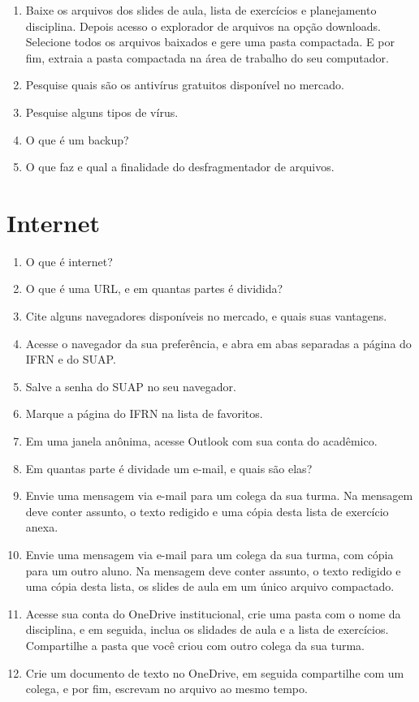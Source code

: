 \documentclass[11pt]{article}
\begin{document}
\begin{enumerate}
		\item Baixe os arquivos dos slides de aula, lista de exercícios e planejamento disciplina. Depois acesso o explorador de arquivos na opção downloads. Selecione todos os arquivos baixados e gere uma pasta compactada. E por fim, extraia a pasta compactada na área de trabalho do seu computador.
		\item Pesquise quais são os antivírus gratuitos disponível no mercado.
		\item Pesquise alguns tipos de vírus.
		\item O que é um backup?
		\item O que faz e qual a finalidade do desfragmentador de arquivos. 
	\end{enumerate}
	
	\section{Internet}
	
	\begin{enumerate}
		\item O que é internet?
		\item O que é uma URL, e em quantas partes é dividida?
		\item Cite alguns navegadores disponíveis no mercado, e quais suas vantagens.
		\item Acesse o navegador da sua preferência, e abra em abas separadas a página do IFRN e do SUAP.
		\item Salve a senha do SUAP no seu navegador.
		\item Marque a página do IFRN na lista de favoritos.
		\item Em uma janela anônima, acesse Outlook com sua conta do acadêmico.
		\item Em quantas parte é dividade um e-mail, e quais são elas?
		\item Envie uma mensagem via e-mail para um colega da sua turma. Na mensagem deve conter assunto, o texto redigido e uma cópia desta lista de exercício anexa.
		\item Envie uma mensagem via e-mail para um colega da sua turma, com cópia para um outro aluno. Na mensagem deve conter assunto, o texto redigido e uma cópia desta lista, os slides de aula em um único arquivo compactado.
		\item Acesse sua conta do OneDrive institucional, crie uma pasta com o nome da disciplina, e em seguida, inclua os slidades de aula e a lista de exercícios. Compartilhe a pasta que você criou com outro colega da sua turma.
		\item Crie um documento de texto no OneDrive, em seguida compartilhe com um colega, e por fim, escrevam no arquivo ao mesmo tempo.
	\end{enumerate}
\end{document}
